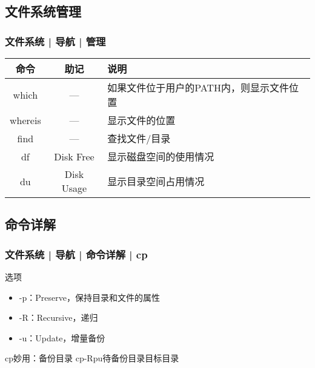\subsection{文件系统管理}
\begin{frame}
  \frametitle{文件系统 | 导航 | \alert{管理}}
  \begin{table}
    \centering
    \begin{tabularx}{0.9\textwidth}{ccX}
      \hline
      \rowcolor{blue!50}命令 & 助记 & 说明\\
      \hline
      which & --- & 如果文件位于用户的PATH内，则显示文件位置\\
      whereis & --- & 显示文件的位置\\
      find & --- & 查找文件/目录\\
      df & Disk Free & 显示磁盘空间的使用情况\\
      du & Disk Usage & 显示目录空间占用情况\\
      \hline
    \end{tabularx}
  \end{table}
\end{frame}

\subsection{命令详解}
\begin{frame}
  \frametitle{文件系统 | 导航 | 命令详解 | cp}
  \begin{block}{选项}
    \begin{itemize}
      \item -p：Preserve，保持目录和文件的属性
      \item -R：Recursive，递归
      \item -u：Update，增量备份
    \end{itemize}
  \end{block}
  \pause
  \begin{block}{cp妙用：备份目录}
    cp\quad -Rpu\quad 待备份目录\quad 目标目录
  \end{block}
\end{frame}

